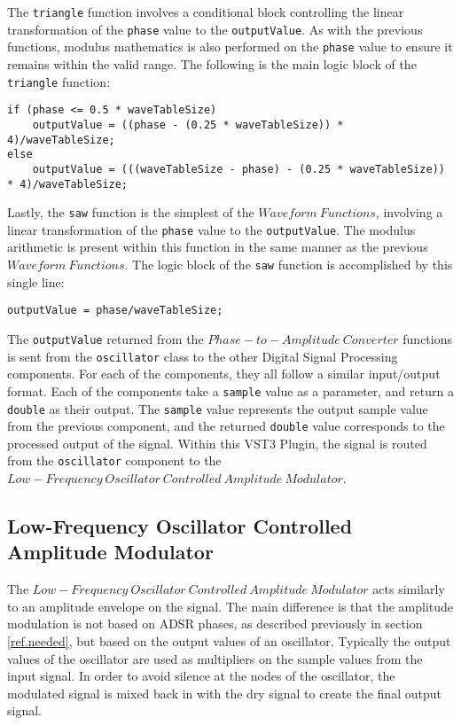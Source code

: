 \documentclass[a4paper,12pt]{report}
\begin{document}
The \texttt{triangle} function involves a conditional block controlling the linear transformation of the \texttt{phase} value to the \texttt{outputValue}.  As with the previous functions, modulus mathematics is also performed on the \texttt{phase} value to ensure it remains within the valid range. The following is the main logic block of the \texttt{triangle} function:
\begin{lstlisting}
if (phase <= 0.5 * waveTableSize)
    outputValue = ((phase - (0.25 * waveTableSize)) * 4)/waveTableSize;
else
    outputValue = (((waveTableSize - phase) - (0.25 * waveTableSize)) * 4)/waveTableSize;
\end{lstlisting}

Lastly, the \texttt{saw} function is the simplest of the $Waveform\ Functions$, involving a linear transformation of the \texttt{phase} value to the \texttt{outputValue}. The modulus arithmetic is present within this function in the same manner as the previous $Waveform\ Functions$. The logic block of the \texttt{saw} function is accomplished by this single line:
\begin{lstlisting}
outputValue = phase/waveTableSize;
\end{lstlisting}

The \texttt{outputValue} returned from the $Phase-to-Amplitude\ Converter$ functions is sent from the \texttt{oscillator} class to the other Digital Signal Processing components. For each of the components, they all follow a similar input/output format. Each of the components take a \texttt{sample} value as a parameter, and return a \texttt{double} as their output. The \texttt{sample} value represents the output sample value from the previous component, and the returned \texttt{double} value corresponds to the processed output of the signal. Within this VST3 Plugin, the signal is routed from the \texttt{oscillator} component to the $Low-Frequency\ Oscillator\ Controlled\ Amplitude\ Modulator$.

\subsection{Low-Frequency Oscillator Controlled Amplitude Modulator}
The $Low-Frequency\ Oscillator\ Controlled\ Amplitude\ Modulator$ acts similarly to an amplitude envelope on the signal. The main difference is that the amplitude modulation is not based on ADSR phases, as described previously in section \ref{ref.needed}, but based on the output values of an oscillator. Typically the output values of the oscillator are used as multipliers on the sample values from the input signal. In order to avoid silence at the nodes of the oscillator, the modulated signal is mixed back in with the dry signal to create the final output signal.
\end{document}
